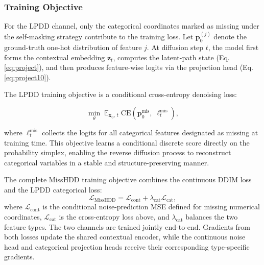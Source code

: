 \documentclass[times, review, 10pt]{elsarticle}
\newcommand{\DIFaddbegin}{\begingroup\color{blue}}
\begin{document}


\subsubsection{Training Objective}

For the LPDD channel, only the categorical coordinates marked as missing
under the self-masking strategy contribute to the training loss. Let
$\mathbf{p}_0^{(j)}$ denote the ground-truth one-hot distribution of feature
$j$. At diffusion step $t$, the model first forms the contextual embedding
$\mathbf{z}_t$, computes the latent-path state (Eq.\ref{eq:project}), and then
produces feature-wise logits via the projection head (Eq.\ref{eq:project10}).

The LPDD training objective is a conditional cross-entropy denoising loss:

\begin{equation}
\min_{\theta}\;
\mathbb{E}_{\mathbf{x}_0,\, t}\;
\mathrm{CE}\!\left(
\mathbf{p}_0^{\mathrm{mis}},\;
\boldsymbol{\ell}_t^{\mathrm{mis}}
\right),
\end{equation}

where $\boldsymbol{\ell}_t^{\mathrm{mis}}$ collects the logits for all
categorical features designated as missing at training time. This objective
learns a conditional discrete score directly on the probability simplex,
enabling the reverse diffusion process to reconstruct categorical variables in
a stable and structure-preserving manner.

\DIFaddbegin
The complete MissHDD training objective combines the continuous DDIM loss and
the LPDD categorical loss:
\begin{equation}
\mathcal{L}_{\mathrm{MissHDD}}
=
\mathcal{L}_{\mathrm{cont}}
+
\lambda_{\mathrm{cat}}\mathcal{L}_{\mathrm{cat}},
\label{eq:joint_loss}
\end{equation}
where $\mathcal{L}_{\mathrm{cont}}$ is the conditional noise-prediction MSE
defined for missing numerical coordinates, $\mathcal{L}_{\mathrm{cat}}$ is the
cross-entropy loss above, and $\lambda_{\mathrm{cat}}$ balances the two
feature types. The two channels are trained jointly end-to-end. Gradients from
both losses update the shared contextual encoder, while the continuous noise
head and categorical projection heads receive their corresponding
type-specific gradients.
\end{document}
